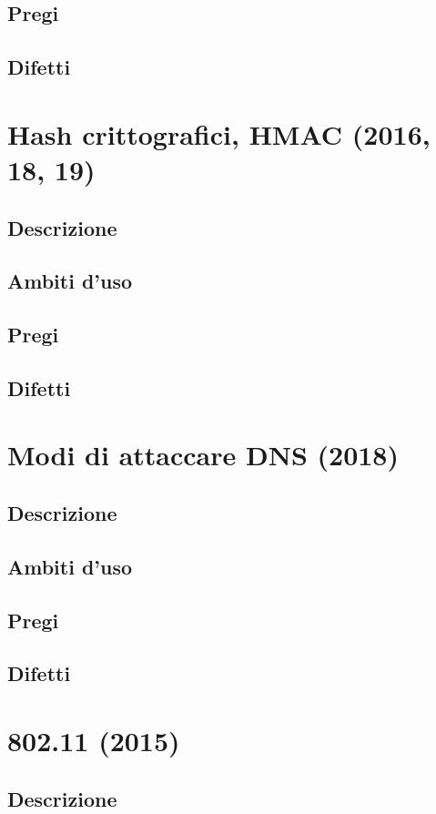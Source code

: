 \documentclass[10pt,oneside,a4paper]{article}
\begin{document}
\subsection{Pregi}
\subsection{Difetti}
\section{Hash crittografici, HMAC (2016, 18, 19)}
\subsection{Descrizione}
\subsection{Ambiti d'uso}
\subsection{Pregi}
\subsection{Difetti}
\section{Modi di attaccare DNS (2018)}
\subsection{Descrizione}
\subsection{Ambiti d'uso}
\subsection{Pregi}
\subsection{Difetti}
\section{802.11 (2015)}
\subsection{Descrizione}
\end{document}
